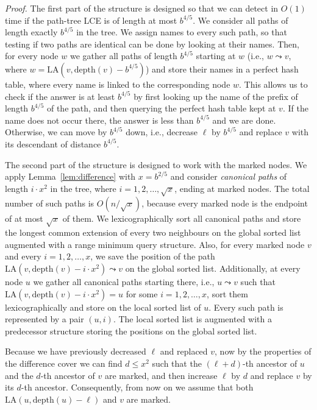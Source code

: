 \documentclass [10pt]{article}
\newenvironment{proof}{\noindent\emph{Proof. }}{}
\newcommand{\depth}{\ensuremath{\mathrm{depth}}}
\newcommand{\LA}{\ensuremath{\mathrm{LA}}}
\begin{document}
\begin{proof}
The first part of the structure is designed so that we can detect in $O(1)$ time if the path-tree LCE is of length at most $b^{4/5}$.
We consider all paths of length exactly $b^{4/5}$ in the tree. We assign names to every such path, so that testing if two paths are identical
can be done by looking at their names. Then, for every node $w$ we gather all paths of length $b^{4/5}$ starting at $w$ (i.e.,
$w\leadsto v$, where $w=\LA(v,\depth(v)-b^{4/5})$) and store their names in a perfect hash table, where every name
is linked to the corresponding node $w$. This allows us to check if the answer is at least $b^{4/5}$ by first looking
up the name of the prefix of length $b^{4/5}$ of the path, and then querying the perfect hash table kept at $v$.
If the name does not occur there, the answer is less than $b^{4/5}$ and we are done. Otherwise, we can move by $b^{4/5}$ down, i.e.,
decrease $\ell$ by $b^{4/5}$ and replace $v$ with its descendant of distance $b^{4/5}$. 


The second part of the structure is designed to work with the marked nodes. We apply Lemma~\ref{lem:difference} with $x=b^{2/5}$
and consider \emph{canonical paths} of length $i\cdot x^{2}$ in the tree, where $i=1,2,\ldots,\sqrt{x}$, ending at marked nodes. The total
number of such paths is $O(n/\sqrt{x})$, because every marked node is the endpoint of at most $\sqrt{x}$ of them.
We lexicographically sort all canonical paths and store the longest common extension of every two neighbours on the global
sorted list augmented with a range minimum query structure. Also, for every marked node $v$ and every  $i=1,2,\ldots,x$, we save the position of the path
$\LA(v,\depth(v)-i\cdot x^{2}) \leadsto v$ on the global sorted list. 
Additionally, at every node $u$ we gather all canonical paths starting there, i.e., $u \leadsto v$ such that $\LA(v,\depth(v)-i\cdot x^{2})=u$
for some $i=1,2,\ldots,x$, sort them lexicographically and store on the local sorted list of $u$. Every such path is represented by a pair $(u,i)$.
The local sorted list is augmented with a predecessor structure storing the positions on the global sorted list.

Because we have previously decreased $\ell$ and replaced $v$, now by the properties of the difference cover we can find $d\leq x^{2}$
such that the $(\ell+d)$-th ancestor of $u$ and the $d$-th ancestor of $v$ are marked, and then increase $\ell$ by $d$ and replace
$v$ by its $d$-th ancestor. Consequently, from now on we assume that both $\LA(u,\depth(u)-\ell)$ and $v$ are marked.


\end{proof}
\end{document}
